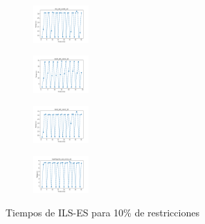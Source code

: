 \begin{figure}[H]
\begin{subfigure}
    \end{subfigure}
    \hfill
    \begin{subfigure}
        \centering
        \includegraphics[width=0.234\textwidth]{img/ils-es/iris_set_const_10_3773969821_time.png}
    \end{subfigure}
    \hfill
    \begin{subfigure}
        \centering
        \includegraphics[width=0.234\textwidth]{img/ils-es/ecoli_set_const_10_3773969821_time.png}
    \end{subfigure}
    \hfill
    \begin{subfigure}
        \centering
        \includegraphics[width=0.234\textwidth]{img/ils-es/rand_set_const_10_3773969821_time.png}
    \end{subfigure}
    \hfill
    \begin{subfigure}
        \centering
        \includegraphics[width=0.234\textwidth]{img/ils-es/newthyroid_set_const_10_3773969821_time.png}
    \end{subfigure}
    \caption{Tiempos de ILS-ES para 10\% de restricciones}
\end{figure}

\vspace*{\fill}
\newpage
\vspace*{\fill}

